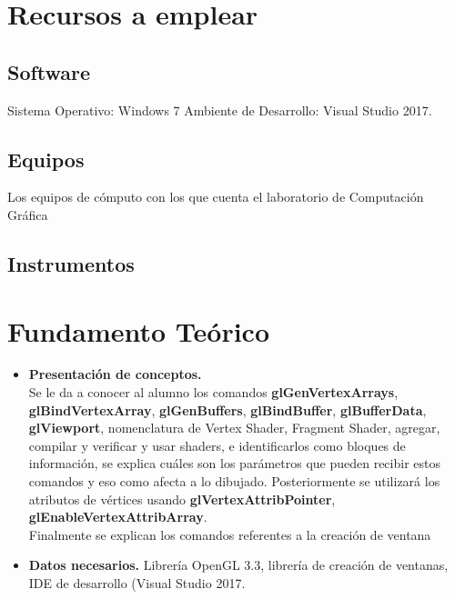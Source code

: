 \documentclass[11pt, english]{article}
\begin{document}
\section{Recursos a emplear}
\subsection{Software}
Sistema Operativo: Windows 7
Ambiente de Desarrollo: Visual Studio 2017.
\subsection{Equipos}
Los equipos de cómputo con los que cuenta el laboratorio de Computación Gráfica
\subsection{Instrumentos}
\section{Fundamento Teórico}
\begin{itemize}
\item \textbf{Presentación de conceptos.} \\
Se le da a conocer al alumno los comandos \textbf{glGenVertexArrays}, \textbf{glBindVertexArray},
\textbf{glGenBuffers}, \textbf{glBindBuffer}, \textbf{glBufferData}, \textbf{glViewport}, nomenclatura de Vertex Shader,
Fragment Shader, agregar, compilar y verificar y usar shaders, e identificarlos como bloques
de información, se explica cuáles son los parámetros que pueden recibir estos comandos y
eso como afecta a lo dibujado. Posteriormente se utilizará los atributos de vértices usando
\textbf{glVertexAttribPointer}, \textbf{glEnableVertexAttribArray}.
\\
Finalmente se explican los comandos referentes a la creación de ventana 
\item \textbf{Datos necesarios.}
Librería OpenGL 3.3, librería de creación de ventanas, IDE de desarrollo (Visual Studio 2017.
\end{itemize}
\end{document}
